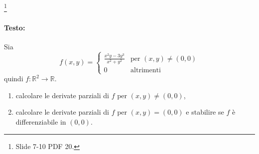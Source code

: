\begin{example}
	\footnote{Slide 7-10 PDF 20.}
	 \paragraph{Testo:} 
	 Sia
	 \begin{equation*}
	 	f(x,y) = 
	 	\begin{cases}
	 		\frac{x^2y-3y^3}{x^2+y^2} &\text{per } (x,y)\neq(0,0)\\
	 		0&\text{altrimenti}
	 	\end{cases}
	 \end{equation*}
	 quindi $f\colon\mathbb{R}^2\rightarrow\mathbb{R}$.
	 \begin{enumerate}
	 	\item calcolare le derivate parziali di $f$ per $(x,y)\neq(0,0)$,
	 	\item calcolare le derivate parziali di $f$ per $(x,y)=(0,0)$ e stabilire se $f$ è differenziabile in $(0,0)$.
	 \end{enumerate}

\end{example}
